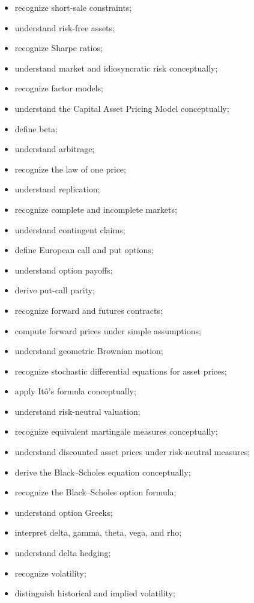 {\begin{itemize}
    \item recognize short-sale constraints;
    \item understand risk-free assets;
    \item recognize Sharpe ratios;
    \item understand market and idiosyncratic risk conceptually;
    \item recognize factor models;
    \item understand the Capital Asset Pricing Model conceptually;
    \item define beta;
    \item understand arbitrage;
    \item recognize the law of one price;
    \item understand replication;
    \item recognize complete and incomplete markets;
    \item understand contingent claims;
    \item define European call and put options;
    \item understand option payoffs;
    \item derive put-call parity;
    \item recognize forward and futures contracts;
    \item compute forward prices under simple assumptions;
    \item understand geometric Brownian motion;
    \item recognize stochastic differential equations for asset prices;
    \item apply It\^o's formula conceptually;
    \item understand risk-neutral valuation;
    \item recognize equivalent martingale measures conceptually;
    \item understand discounted asset prices under risk-neutral measures;
    \item derive the Black--Scholes equation conceptually;
    \item recognize the Black--Scholes option formula;
    \item understand option Greeks;
    \item interpret delta, gamma, theta, vega, and rho;
    \item understand delta hedging;
    \item recognize volatility;
    \item distinguish historical and implied volatility;

\end{itemize}}
